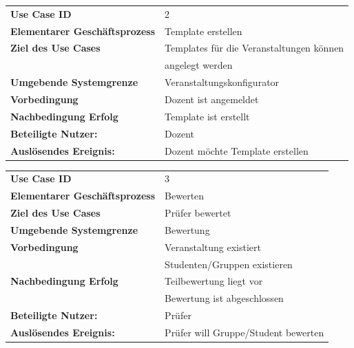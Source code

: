 		\begin{table}[H]
		\begin{tabular}{|ll}
		  \rowcolor{hellgrau}\textbf{Use Case ID} & 2 \\
	 	 \textbf{Elementarer Geschäftsprozess} &  Template erstellen \\ 
		 \textbf{Ziel des Use Cases} & Templates für die Veranstaltungen können \\& angelegt werden   \\
		 \textbf{Umgebende Systemgrenze}& Veranstaltungskonfigurator \\ 
		 \textbf{Vorbedingung} & Dozent ist angemeldet \\ 
		 \textbf{Nachbedingung Erfolg} & Template ist erstellt \\ 
		 \textbf{Beteiligte Nutzer:} & Dozent \\ 
	     \textbf{Auslösendes Ereignis:} & Dozent möchte Template erstellen \\ 
		 
		\end{tabular} 
		\label{tab:usecase_2}
		\end{table}
	
	
			\begin{table}[H]
			\begin{tabular}{|ll}
			  \rowcolor{hellgrau}\textbf{Use Case ID} & 3 \\
		 	 \textbf{Elementarer Geschäftsprozess} &  Bewerten \\ 
			 \textbf{Ziel des Use Cases} & Prüfer bewertet  \\
			 \textbf{Umgebende Systemgrenze} & Bewertung \\ 
			 \textbf{Vorbedingung} & Veranstaltung existiert \\
			  					   & Studenten/Gruppen existieren \\ 
			 \textbf{Nachbedingung Erfolg} & Teilbewertung liegt vor \\
			 							   & Bewertung ist abgeschlossen\\
			 							    
			 \textbf{Beteiligte Nutzer:} & Prüfer \\ 
		     \textbf{Auslösendes Ereignis:} & Prüfer will Gruppe/Student bewerten \\ 
			 
			\end{tabular} 
			\label{tab:usecase_3}
			\end{table}
			
